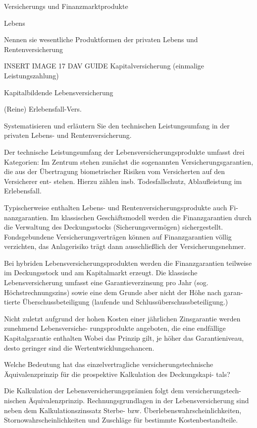 Versicherungs und Finanzmarktprodukte


Lebens

Nennen sie wesentliche Produktformen der privaten Lebens und Rentenversicherung

INSERT IMAGE 17 DAV GUIDE
Kapitalversicherung
(einmalige Leistungszahlung)

Kapitalbildende
Lebensversicherung

(Reine) Erlebensfall-Vers.



Systematisieren und erläutern Sie den technischen Leistungsumfang in
der privaten Lebens- und Rentenversicherung.

Der technische Leistungsumfang der Lebensversicherungsprodukte umfasst drei
Kategorien:
Im Zentrum stehen zunächst die sogenannten Versicherungsgarantien, die aus
der Übertragung biometrischer Risiken vom Versicherten auf den Versicherer ent-
stehen. Hierzu zählen insb. Todesfallschutz, Ablaufleistung im Erlebensfall.

Typischerweise enthalten Lebens- und Rentenversicherungsprodukte auch Fi-
nanzgarantien. Im klassischen Geschäftsmodell werden die Finanzgarantien
durch die Verwaltung des Deckungsstocks (Sicherungsvermögen) sichergestellt.
Fondsgebundene Versicherungsverträgen können auf Finanzgarantien völlig
verzichten, das Anlagerisiko trägt dann ausschließlich der Versicherungsnehmer.

Bei hybriden Lebensversicherungsprodukten werden
die Finanzgarantien teilweise im Deckungsstock und am Kapitalmarkt erzeugt. Die
klassische Lebensversicherung umfasst eine Garantieverzinsung pro Jahr (sog.
Höchstrechnungszins) sowie eine dem Grunde aber nicht der Höhe nach garan-
tierte Überschussbeteiligung (laufende und Schlussüberschussbeteiligung.)

Nicht zuletzt aufgrund der hohen Kosten einer jährlichen Zinsgarantie werden zunehmend Lebensversiche-
rungsprodukte angeboten, die eine endfällige Kapitalgarantie enthalten
Wobei das Prinzip gilt, je höher das Garantieniveau, desto geringer sind die
Wertentwicklungschancen.


Welche Bedeutung hat das einzelvertragliche versicherungstechnische
Äquivalenzprinzip für die prospektive Kalkulation des Deckungskapi-
tals?


Die Kalkulation der Lebensversicherungsprämien folgt dem versicherungstech-
nischen Äquivalenzprinzip.
Rechnungsgrundlagen in der Lebensversicherung sind neben dem Kalkulationszinssatz 
Sterbe- bzw. Überlebenswahrscheinlichkeiten, Stornowahrscheinlichkeiten und Zuschläge für
bestimmte Kostenbestandteile.

